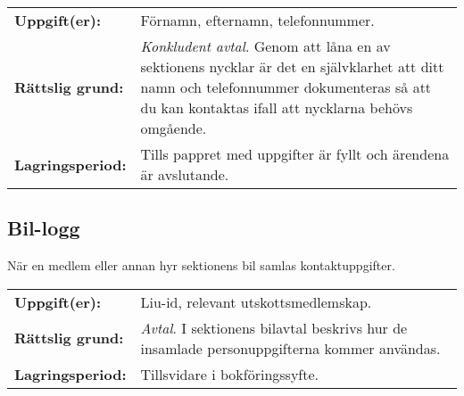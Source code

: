 \documentclass{datateknologsektionen-document}
\begin{document}
\begin{longtabu}{l X}
  \textbf{Uppgift(er):}    & Förnamn, efternamn, telefonnummer. \\
  \textbf{Rättslig grund:} & \textit{Konkludent avtal}. Genom att låna en av sektionens nycklar är det en självklarhet att ditt namn och telefonnummer dokumenteras så att du kan kontaktas ifall att nycklarna behövs omgående.\\
  \textbf{Lagringsperiod:} & Tills pappret med uppgifter är fyllt och ärendena är avslutande.
\end{longtabu}

\subsection{Bil-logg}
När en medlem eller annan hyr sektionens bil samlas kontaktuppgifter.

\begin{longtabu}{l X}
  \textbf{Uppgift(er):}    & Liu-id, relevant utskottsmedlemskap. \\
  \textbf{Rättslig grund:} & \textit{Avtal}. I sektionens bilavtal beskrivs hur de insamlade personuppgifterna
  kommer användas.\\
  \textbf{Lagringsperiod:} & Tillsvidare i bokföringssyfte.
\end{longtabu}
\end{document}
